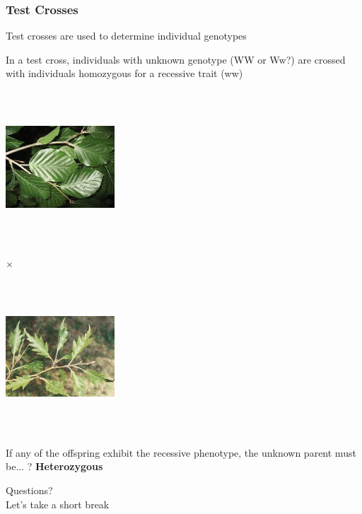 \documentclass{beamer}
\begin{document}
\begin{frame}
	\frametitle{Test Crosses}
	Test crosses are used to determine individual genotypes
	\bigskip 
	
	In a test cross,  individuals with unknown genotype (WW or Ww?) are crossed with individuals homozygous for a recessive trait (ww)

	\begin{center}
		\newcommand{\picA}{\includegraphics[keepaspectratio, height=2.25in,width=1.6in]{img/roundBeechLeaf}}
		\newcommand{\picB}{\includegraphics[keepaspectratio, height=2.25in,width=1.6in]{img/cutBeechLeaf}}
		\Huge
		\parbox{\widthof{\picA}}{\picA} $\times$ 
		\parbox{\widthof{\picB}}{\picB} 
	\end{center}	

	If any of the offspring exhibit the recessive phenotype, the unknown parent must be... ?\pause \textbf{ Heterozygous}
	
	
\end{frame}


\begin{frame}

\Huge
Questions? \\ \pause
Let's take a short break
	
\end{frame}



\end{document}
